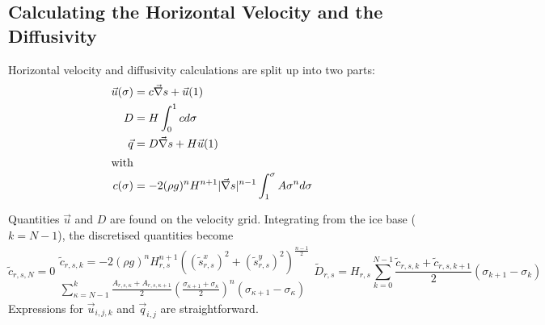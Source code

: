 \subsection{Calculating the Horizontal Velocity and the Diffusivity}
Horizontal velocity and diffusivity calculations are split up into two parts:
\begin{subequations}
  \label{kin.eq.horiz_diffusivity}
  \begin{align}
    \vec u(\sigma)&=c\vec\nabla s+\vec u(1)\\
    D &=H\int_0^1cd\sigma\\
    \vec q&=D\vec\nabla s+H\vec u(1)\\
    \intertext{with}
    c(\sigma)&=-2(\rho g)^nH^{n+1}|\vec\nabla s|^{n-1}\int_1^\sigma A\sigma^nd\sigma
  \end{align}
\end{subequations}

Quantities $\vec u$ and $D$ are found on the velocity grid. Integrating from the ice base ($k=N-1$), the discretised quantities become
\begin{subequations}
  \begin{equation}
    \tilde{c}_{r,s,N}=0
  \end{equation}
  \begin{multline}
    \tilde{c}_{r,s,k}=-2(\rho g)^nH_{r,s}^{n+1}\left(({\tilde{s}^x_{r,s}})^2+({\tilde{s}^y_{r,s}})^2\right)^{\frac{n-1}{2}}\\
    \sum_{\kappa=N-1}^k\frac{A_{r,s,\kappa}+A_{r,s,\kappa+1}}2 \left(\frac{\sigma_{\kappa+1}+\sigma_\kappa}2\right)^n(\sigma_{\kappa+1}-\sigma_\kappa)
  \end{multline}
  \begin{equation}
    \tilde{D}_{r,s}=H_{r,s}\sum_{k=0}^{N-1}\frac{\tilde{c}_{r,s,k}+\tilde{c}_{r,s,k+1}}2(\sigma_{k+1}-\sigma_k)
  \end{equation}
\end{subequations}
Expressions for $\vec{u}_{i,j,k}$ and $\vec{q}_{i,j}$ are straightforward.

